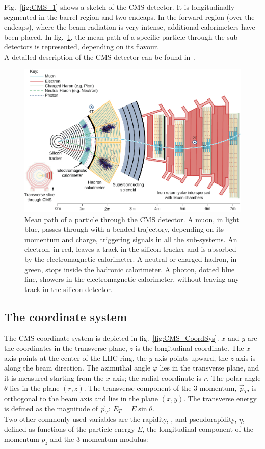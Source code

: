 \noindent Fig.~\ref{fig:CMS_1} shows a sketch of the CMS detector. It is longitudinally segmented in the barrel region and two endcaps. In the forward region (over the endcaps), where the beam radiation is very intense, additional calorimeters have been placed. In fig.~\ref{fig:CMS_particles}, the mean path of a specific particle through the sub-detectors is represented, depending on its flavour.\\
A detailed description of the CMS detector can be found in~\cite{Chatrchyan:2008zzk}.

\begin{figure}[!htb]
  \centering
    \includegraphics[width=.99\textwidth]{figures/CMS_particles.jpg}
  \caption{Mean path of a particle through the CMS detector. A muon, in light blue, passes through with a bended trajectory, depending on its momentum and charge, triggering signals in all the sub-systems. An electron, in red, leaves a track in the silicon tracker and is absorbed by the electromagnetic calorimeter. A neutral or charged hadron, in green, stops inside the hadronic calorimeter. A photon, dotted blue line, showers in the electromagnetic calorimeter, without leaving any track in the silicon detector.~\cite{Chatrchyan:2008zzk}}
  \label{fig:CMS_particles}
\end{figure}

\subsection{The coordinate system}
\label{ssec:coord_syst}
The CMS coordinate system is depicted in fig.~\ref{fig:CMS_CoordSys}. $x$ and $y$ are the coordinates in the transverse plane, $z$ is the longitudinal coordinate. The $x$ axis points at the center of the LHC ring, the $y$ axis points upward, the $z$ axis is along the beam direction. The azimuthal angle $\varphi$ lies in the transverse plane, and it is measured starting from the $x$ axis; the radial coordinate is $r$. The polar angle $\theta$ lies in the plane $(r,z)$. The transverse component of the 3-momentum, $\vec{p}_T$, is orthogonal to the beam axis and lies in the plane $(x,y)$. The transverse energy is defined as the magnitude of $\vec{p}_T$: $E_T = E \sin{\theta}$.\\
Two other commonly used variables are the rapidity, \rap, and pseudorapidity, $\eta$, defined as functions of the particle energy $E$, the longitudinal component of the momentum $p_z$ and the 3-momentum modulus:

